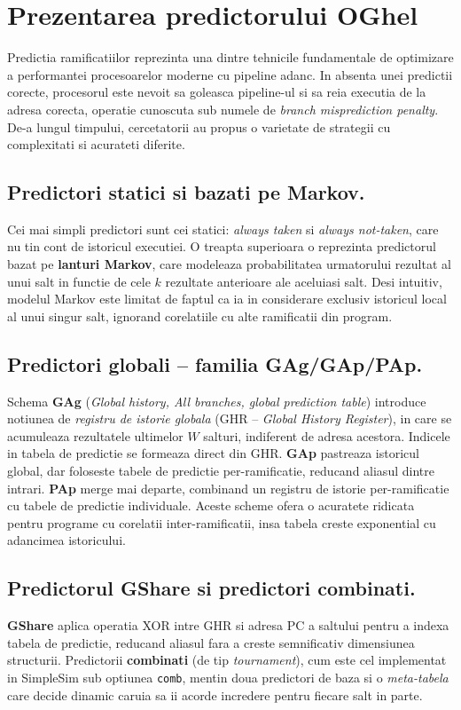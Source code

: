 \section{Prezentarea predictorului OGhel}

Predictia ramificatiilor reprezinta una dintre tehnicile fundamentale de optimizare a performantei procesoarelor moderne cu pipeline adanc.
In absenta unei predictii corecte, procesorul este nevoit sa goleasca pipeline-ul si sa reia executia de la adresa corecta,
operatie cunoscuta sub numele de \textit{branch misprediction penalty}. De-a lungul timpului, cercetatorii au propus o
varietate de strategii cu complexitati si acurateti diferite.

\subsection*{Predictori statici si bazati pe Markov.}
Cei mai simpli predictori sunt cei statici: \textit{always taken} si \textit{always not-taken}, care nu tin cont de istoricul executiei.
O treapta superioara o reprezinta predictorul bazat pe \textbf{lanturi Markov}, care modeleaza probabilitatea urmatorului rezultat
al unui salt in functie de cele $k$ rezultate anterioare ale aceluiasi salt. Desi intuitiv, modelul Markov este limitat de faptul
ca ia in considerare exclusiv istoricul local al unui singur salt, ignorand corelatiile cu alte ramificatii din program.

\subsection*{Predictori globali -- familia GAg/GAp/PAp.}
Schema \textbf{GAg} (\textit{Global history, All branches, global prediction table}) introduce notiunea de
\textit{registru de istorie globala} (GHR -- \textit{Global History Register}), in care se acumuleaza
rezultatele ultimelor $W$ salturi, indiferent de adresa acestora. Indicele in tabela de predictie se
formeaza direct din GHR. \textbf{GAp} pastreaza istoricul global, dar foloseste tabele de predictie
per-ramificatie, reducand aliasul dintre intrari. \textbf{PAp} merge mai departe, combinand un
registru de istorie per-ramificatie cu tabele de predictie individuale. Aceste scheme ofera o
acuratete ridicata pentru programe cu corelatii inter-ramificatii, insa tabela creste exponential
cu adancimea istoricului.

\subsection*{Predictorul GShare si predictori combinati.}
\textbf{GShare} aplica operatia XOR intre GHR si adresa PC a saltului pentru a indexa tabela de predictie,
reducand aliasul fara a creste semnificativ dimensiunea structurii. Predictorii \textbf{combinati} (de tip \textit{tournament}),
cum este cel implementat in SimpleSim sub optiunea \texttt{comb}, mentin doua predictori de baza si o \textit{meta-tabela}
care decide dinamic caruia sa ii acorde incredere pentru fiecare salt in parte.


